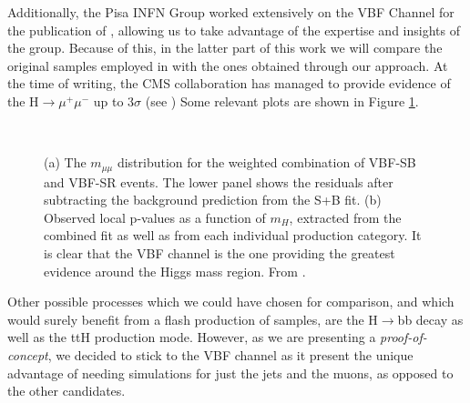 Additionally, the Pisa INFN Group worked extensively on the VBF Channel for the publication of \cite{CMS-PAS-HIG-19-006}, allowing us to take advantage of the expertise and insights of the group.
Because of this, in the latter part of this work we will compare the original samples employed in \cite{CMS-PAS-HIG-19-006} with the ones obtained through our approach.
At the time of writing, the CMS collaboration has managed to provide evidence of the H$\rightarrow\mu^+\mu^-$ up to 3$\sigma$ (see \cite{Sirunyan_2021}) Some relevant plots are shown in Figure \ref{fig:vbfmm}.

\begin{figure}
    \myfloatalign
     \quad
     \\
    \caption[H$\rightarrow\mu^+\mu^-$]{(a) The $m_{\mu\mu}$ distribution for the weighted combination of VBF-SB and VBF-SR events. The lower panel shows the residuals after subtracting the background prediction from the S+B fit. (b) Observed local p-values as a function of $m_H$, extracted from the combined fit as well as from each individual production category. It is clear that the VBF channel is the one providing the greatest evidence around the Higgs mass region. From \cite{Sirunyan_2021}.}\label{fig:vbfmm}
    
\end{figure}

Other possible processes which we could have chosen for comparison, and which would surely benefit from a flash production of samples, are the H$\rightarrow$bb decay as well as the ttH production mode. However, as we are presenting a \emph{proof-of-concept}, we decided to stick to the VBF channel as it present the unique advantage of needing simulations for just the jets and the muons, as opposed to the other candidates. 